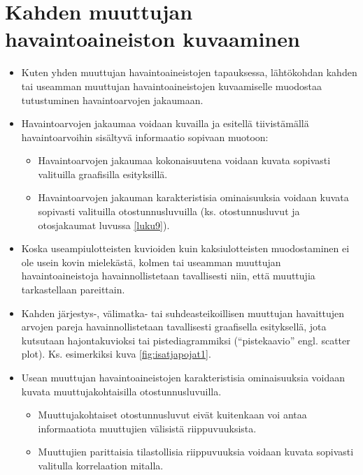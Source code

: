 \documentclass[
]{book}
\providecommand{\tightlist}{%
  \setlength{\itemsep}{0pt}\setlength{\parskip}{0pt}}
\begin{document}
\hypertarget{alaluku62}{%
\section{Kahden muuttujan havaintoaineiston kuvaaminen}\label{alaluku62}}

\begin{itemize}
\item
  Kuten yhden muuttujan havaintoaineistojen tapauksessa, lähtökohdan kahden tai useamman muuttujan havaintoaineistojen kuvaamiselle muodostaa tutustuminen havaintoarvojen jakaumaan.
\item
  Havaintoarvojen jakaumaa voidaan kuvailla ja esitellä tiivistämällä havaintoarvoihin sisältyvä informaatio sopivaan muotoon:

  \begin{itemize}
  \tightlist
  \item
    Havaintoarvojen jakaumaa kokonaisuutena voidaan kuvata sopivasti valituilla graafisilla esityksillä.
  \item
    Havaintoarvojen jakauman karakteristisia ominaisuuksia voidaan kuvata sopivasti valituilla otostunnusluvuilla (ks. otostunnusluvut ja otosjakaumat luvussa \ref{luku9}).
  \end{itemize}
\item
  Koska useampiulotteisten kuvioiden kuin kaksiulotteisten muodostaminen ei ole usein kovin mielekästä, kolmen tai useamman muuttujan havaintoaineistoja havainnollistetaan tavallisesti niin, että muuttujia tarkastellaan pareittain.
\item
  Kahden järjestys-, välimatka- tai suhdeasteikoillisen muuttujan havaittujen arvojen pareja havainnollistetaan tavallisesti graafisella esityksellä, jota kutsutaan hajontakuvioksi tai pistediagrammiksi (``pistekaavio'' engl. scatter plot). Ks. esimerkiksi kuva \ref{fig:isatjapojat1}.
\item
  Usean muuttujan havaintoaineistojen karakteristisia ominaisuuksia voidaan kuvata muuttujakohtaisilla otostunnusluvuilla.

  \begin{itemize}
  \tightlist
  \item
    Muuttujakohtaiset otostunnusluvut eivät kuitenkaan voi antaa informaatiota muuttujien välisistä riippuvuuksista.
  \item
    Muuttujien parittaisia tilastollisia riippuvuuksia voidaan kuvata sopivasti valitulla korrelaation mitalla.
  \end{itemize}
\end{itemize}
\end{document}
